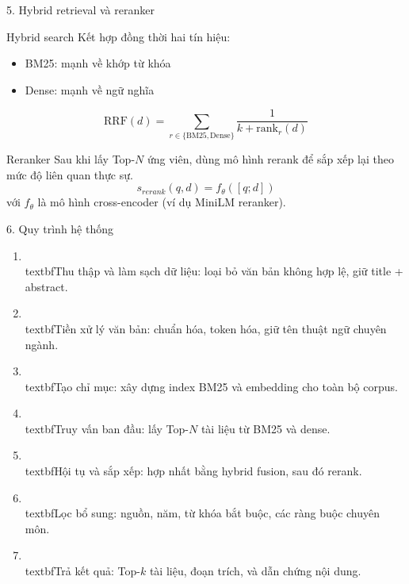 \documentclass[aspectratio=169]{beamer}
\begin{document}
\begin{frame}{5. Hybrid retrieval và reranker}
  \begin{block}{Hybrid search}
    Kết hợp đồng thời hai tín hiệu:
    \begin{itemize}
      \item BM25: mạnh về khớp từ khóa\
      \item Dense: mạnh về ngữ nghĩa\
    \end{itemize}
  \end{block}

  \begin{equation}
    \mathrm{RRF}(d) = \sum_{r \in \{\mathrm{BM25},\mathrm{Dense}\}} \frac{1}{k + \mathrm{rank}_r(d)}
  \end{equation}

  \begin{block}{Reranker}
    Sau khi lấy Top-$N$ ứng viên, dùng mô hình rerank để sắp xếp lại theo mức độ liên quan thực sự.
    \begin{equation}
      s_{rerank}(q,d)=f_\theta([q;d])
    \end{equation}
    với $f_\theta$ là mô hình cross-encoder (ví dụ MiniLM reranker).
  \end{block}
\end{frame}

\begin{frame}{6. Quy trình hệ thống}
  \begin{enumerate}
    \item \\textbf{Thu thập và làm sạch dữ liệu}: loại bỏ văn bản không hợp lệ, giữ title + abstract.\
    \item \\textbf{Tiền xử lý văn bản}: chuẩn hóa, token hóa, giữ tên thuật ngữ chuyên ngành.\
    \item \\textbf{Tạo chỉ mục}: xây dựng index BM25 và embedding cho toàn bộ corpus.\
    \item \\textbf{Truy vấn ban đầu}: lấy Top-$N$ tài liệu từ BM25 và dense.\
    \item \\textbf{Hội tụ và sắp xếp}: hợp nhất bằng hybrid fusion, sau đó rerank.\
    \item \\textbf{Lọc bổ sung}: nguồn, năm, từ khóa bắt buộc, các ràng buộc chuyên môn.\
    \item \\textbf{Trả kết quả}: Top-$k$ tài liệu, đoạn trích, và dẫn chứng nội dung.
  \end{enumerate}
\end{frame}
\end{document}
